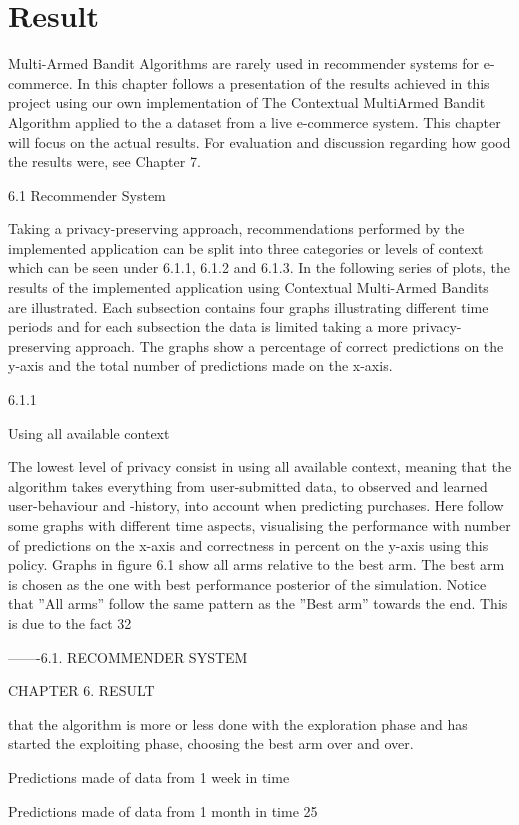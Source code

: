 \chapter{Result}
Multi-Armed Bandit Algorithms are rarely used in recommender systems
for e-commerce. In this chapter follows a presentation of the results achieved
in this project using our own implementation of The Contextual MultiArmed Bandit Algorithm applied to the a dataset from a live e-commerce
system. This chapter will focus on the actual results. For evaluation and discussion
regarding how good the results were, see Chapter 7.

6.1
Recommender System

Taking a privacy-preserving approach, recommendations performed by the implemented
application can be split into three categories or levels of context which can be seen under
6.1.1, 6.1.2 and 6.1.3. In the following series of plots, the results of the implemented
application using Contextual Multi-Armed Bandits are illustrated. Each subsection contains four graphs illustrating different time periods and for each subsection the data is
limited taking a more privacy-preserving approach. The graphs show a percentage of
correct predictions on the y-axis and the total number of predictions made on the x-axis.

6.1.1

Using all available context

The lowest level of privacy consist in using all available context, meaning that the algorithm takes everything from user-submitted data, to observed and learned user-behaviour and -history, into account when predicting purchases. Here follow some graphs with different time aspects, visualising the performance with number of predictions on the x-axis
and correctness in percent on the y-axis using this policy.
Graphs in figure 6.1 show all arms relative to the best arm. The best arm is chosen as the one with best performance posterior of the simulation. Notice that ”All arms” follow the same pattern as the ”Best arm” towards the end. This is due to the fact
32

-------6.1. RECOMMENDER SYSTEM

CHAPTER 6. RESULT

that the algorithm is more or less done with the exploration phase and has started the
exploiting phase, choosing the best arm over and over.

Predictions made of data from 1 week in time

Predictions made of data from 1 month in time
25

